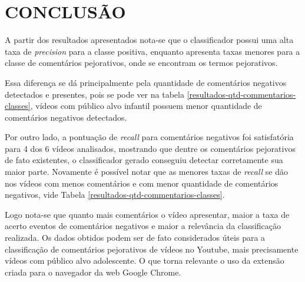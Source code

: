 \section{CONCLUSÃO}


A partir dos resultados apresentados nota-se que o classificador possui uma alta taxa de \textit{precision} para a classe positiva, enquanto apresenta taxas menores para a classe de comentários pejorativos, onde se encontram os termos pejorativos.

Essa diferença se dá principalmente pela quantidade de comentários negativos detectados e presentes, pois se pode ver na tabela \ref{resultados-qtd-commentarios-classes}, vídeos com público alvo infantil possuem menor quantidade de comentários negativos detectados.

Por outro lado, a pontuação de \textit{recall} para comentários negativos foi satisfatória para 4 dos 6 vídeos analisados, mostrando que dentre os comentários pejorativos de fato existentes, o classificador gerado conseguiu detectar corretamente sua maior parte. Novamente é possível notar que as menores taxas de \textit{recall} se dão nos vídeos com menos comentários e com menor quantidade de comentários negativos, vide Tabela \ref{resultados-qtd-commentarios-classes}.%


Logo nota-se que quanto mais comentários o vídeo apresentar, maior a taxa de acerto eventos de comentários negativos e maior a relevância da classificação realizada.
Os dados obtidos podem ser de fato considerados úteis para a classificação de comentários pejorativos de vídeos no Youtube, mais precisamente vídeos com público alvo adolescente. O que torna relevante o uso da extensão criada para o navegador da web Google Chrome.
